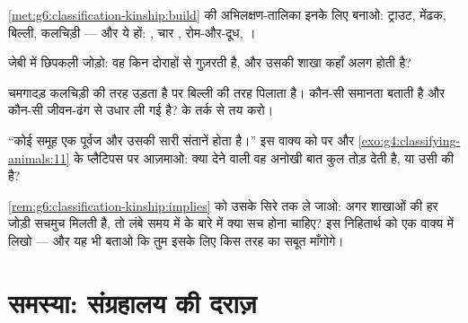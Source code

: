 \begin{exercise}[$\star\star$]\label{exo:g6:classification-kinship:8}
\cref{met:g6:classification-kinship:build} की अभिलक्षण-तालिका इनके लिए
बनाओ: ट्राउट, मेंढक, बिल्ली, कलचिड़ी --- और  ये हों: , चार
, रोम-और-दूध, ।
\end{exercise}

\begin{exercise}[$\star\star$]\label{exo:g6:classification-kinship:9}
जेबी  में छिपकली जोड़ो: वह किन दोराहों से गुज़रती है, और उसकी शाखा
कहाँ अलग होती है?
\end{exercise}

\begin{exercise}[$\star\star$]\label{exo:g6:classification-kinship:10}
चमगादड़ कलचिड़ी की तरह उड़ता है पर बिल्ली की तरह  पिलाता है। कौन-सी
समानता  बताती है और कौन-सी जीवन-ढंग से उधार ली गई है?  के
तर्क से तय करो।
\end{exercise}

\begin{exercise}[$\star\star$]\label{exo:g6:classification-kinship:11}
``कोई समूह एक पूर्वज और उसकी सारी संतानें होता है।'' इस वाक्य को
 पर और \cref{exo:g4:classifying-animals:11} के प्लैटिपस पर
आज़माओ: क्या  देने वाली वह अनोखी बात कुल तोड़ देती है, या उसी की
है?
\end{exercise}

\begin{exercise}[$\star\star\star$]\label{exo:g6:classification-kinship:12}
\cref{rem:g6:classification-kinship:implies} को उसके सिरे तक ले जाओ:
अगर शाखाओं की हर जोड़ी सचमुच मिलती है, तो लंबे समय में  के
बारे में क्या सच होना चाहिए? इस निहितार्थ को एक वाक्य में लिखो --- और
यह भी बताओ कि तुम इसके लिए किस तरह का सबूत माँगोगे।
\end{exercise}

\section{समस्या: संग्रहालय की दराज़}

